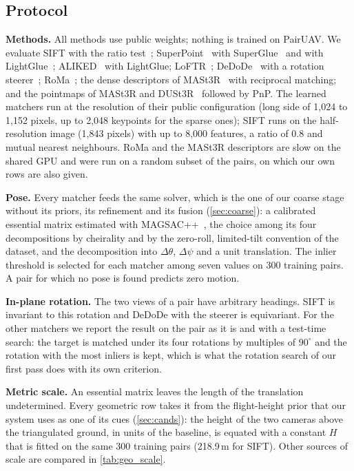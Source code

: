 \documentclass[10pt,twocolumn,letterpaper]{article}
\newcommand{\dth}{\Delta\theta}
\newcommand{\dpsi}{\Delta\psi}
\begin{document}
\subsection{Protocol}
\label{sec:geoprotocol}

\noindent\textbf{Methods.} All methods use public weights; nothing is trained on PairUAV. We evaluate SIFT with the ratio test~\cite{lowe2004sift}; SuperPoint~\cite{detone2018superpoint} with SuperGlue~\cite{sarlin2020superglue} and with LightGlue~\cite{lindenberger2023lightglue}; ALIKED~\cite{zhao2023aliked} with LightGlue; LoFTR~\cite{sun2021loftr}; DeDoDe~\cite{edstedt2024dedode} with a rotation steerer~\cite{bokman2024steerers}; RoMa~\cite{edstedt2024roma}; the dense descriptors of MASt3R~\cite{leroy2024mast3r} with reciprocal matching; and the pointmaps of MASt3R and DUSt3R~\cite{wang2024dust3r} followed by PnP. The learned matchers run at the resolution of their public configuration (long side of 1{,}024 to 1{,}152 pixels, up to 2{,}048 keypoints for the sparse ones); SIFT runs on the half-resolution image (1{,}843 pixels) with up to 8{,}000 features, a ratio of 0.8 and mutual nearest neighbours. RoMa and the MASt3R descriptors are slow on the shared GPU and were run on a random subset of the pairs, on which our own rows are also given.

\noindent\textbf{Pose.} Every matcher feeds the same solver, which is the one of our coarse stage without its priors, its refinement and its fusion (\cref{sec:coarse}): a calibrated essential matrix estimated with MAGSAC++~\cite{barath2020magsacpp}, the choice among its four decompositions by cheirality and by the zero-roll, limited-tilt convention of the dataset, and the decomposition into $\dth$, $\dpsi$ and a unit translation. The inlier threshold is selected for each matcher among seven values on 300 training pairs. A pair for which no pose is found predicts zero motion.

\noindent\textbf{In-plane rotation.} The two views of a pair have arbitrary headings. SIFT is invariant to this rotation and DeDoDe with the steerer is equivariant. For the other matchers we report the result on the pair as it is and with a test-time search: the target is matched under its four rotations by multiples of $90^\circ$ and the rotation with the most inliers is kept, which is what the rotation search of our first pass does with its own criterion.

\noindent\textbf{Metric scale.} An essential matrix leaves the length of the translation undetermined. Every geometric row takes it from the flight-height prior that our system uses as one of its cues (\cref{sec:cands}): the height of the two cameras above the triangulated ground, in units of the baseline, is equated with a constant $H$ that is fitted on the same 300 training pairs (218.9\,m for SIFT). Other sources of scale are compared in \cref{tab:geo_scale}.
\end{document}
